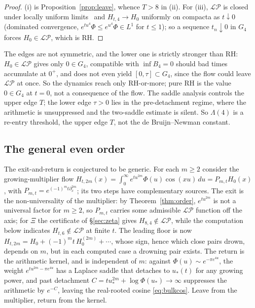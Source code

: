 \documentclass[11pt,reqno]{amsart}
\theoremstyle{plain}
\theoremstyle{definition}
\theoremstyle{remark}
\newcommand{\LP}{\mathcal{LP}}
\begin{document}
\begin{proof}
(i) is Proposition~\ref{prop:leave}, whence $T>8$ in (ii). For (iii), $\LP$ is
closed under locally uniform limits~\cite{Levin} and $H_{t,4}\to H_0$ uniformly
on compacta as $t\downarrow0$ (dominated convergence,
$e^{tu^4}\Phi\le e^{u^4}\Phi\in L^1$ for $t\le1$); so a sequence $t_n\downarrow0$
in $G_4$ forces $H_0\in\LP$, which is RH.
\end{proof}

The edges are not symmetric, and the lower one is strictly stronger than RH:
$H_0\in\LP$ gives only $0\in G_4$, compatible with $\inf B_4=0$ should bad times
accumulate at $0^+$, and does not even yield $[0,\tau]\subset G_4$, since the flow
could leave $\LP$ at once. So the dynamics reach only RH-or-more; pure RH is the
value $0\in G_4$ at $t=0$, not a consequence of the flow. The saddle analysis
controls the upper edge $T$; the lower edge $\tau>0$ lies in the pre-detachment
regime, where the arithmetic is unsuppressed and the two-saddle estimate is
silent. So $\Lambda(4)$ is a re-entry threshold, the upper edge $T$, not the de
Bruijn--Newman constant.

\subsection{The general even order}
The exit-and-return is conjectured to be generic. For each $m\ge2$ consider the
growing-multiplier flow $H_{t,2m}(x)=\int_0^\infty e^{tu^{2m}}\Phi(u)\cos(xu)\,du
=P_{m,t}H_0(x)$, with $P_{m,t}=e^{(-1)^m t\partial_x^{2m}}$; its two steps have
complementary sources. The exit is the non-universality of the multiplier:
by Theorem~\ref{thm:order}, $e^{tu^{2m}}$ is not a universal factor for $m\ge2$,
so $P_{m,t}$ carries some admissible $\LP$ function off the axis; for $\Xi$
the certificate of \S\ref{sec:zeta} gives $H_{8,4}\notin\LP$, while the
computation below indicates $H_{t,6}\notin\LP$ at finite $t$. The
leading floor is now $H_{t,2m}=H_0+(-1)^m t\,H_0^{(2m)}+\cdots$, whose sign,
hence which close pairs drown, depends on $m$, but in each computed case a
drowning pair exists. The return is the arithmetic kernel, and is
independent of $m$: against $\Phi(u)\sim e^{-\pi e^{4u}}$, the weight
$e^{tu^{2m}-\pi e^{4u}}$ has a Laplace saddle that detaches to $u_*(t)$ for any
growing power, and past detachment $C=tu_*^{2m}+\log\Phi(u_*)\to\infty$ suppresses
the arithmetic by $e^{-C}$, leaving the real-rooted cosine \eqref{eq:bulkcos}.
Leave from the multiplier, return from the kernel.
\end{document}
